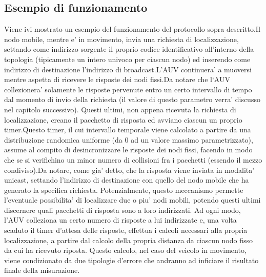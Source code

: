 \subsection{Esempio di funzionamento}
Viene ivi mostrato un esempio del funzionamento del protocollo sopra descritto.\newline Il nodo mobile, mentre e' in movimento, invia una richiesta di localizzazione, settando come indirizzo sorgente il proprio codice identificativo all'interno della topologia (tipicamente un intero univoco per ciascun nodo)
ed inserendo come indirizzo di destinazione l'indirizzo di broadcast.\newline L'AUV continuera' a muoversi mentre aspetta di ricevere le risposte dei nodi fissi.\newline Da notare che l`AUV collezionera' solamente le risposte pervenute entro un certo intervallo di tempo dal momento di invio della richiesta (il valore di questo parametro verra' discusso nel capitolo successivo).\newline
Questi ultimi, non appena ricevuta la richiesta di localizzazione, creano il pacchetto di risposta ed avviano ciascun un proprio timer.\newline Questo timer, il cui intervallo temporale viene calcolato a partire da una distribuzione randomica uniforme (da 0 ad un valore massimo parametrizzato), assume al compito di desincronizzare le risposte dei nodi fissi,
facendo in modo che se si verifichino un minor numero di collisioni fra i pacchetti (essendo il mezzo condiviso).\newline Da notare, come gia' detto, che la risposta viene inviata in modalita' unicast, settando l'indirizzo di destinazione con quello del nodo mobile che ha generato la specifica richiesta.\newline
Potenzialmente, questo meccanismo permette l'eventuale possibilita' di localizzare due o piu' nodi mobili, potendo questi ultimi discernere quali pacchetti di risposta sono a loro indirizzati.\newline
Ad ogni modo, l'AUV colleziona un certo numero di risposte a lui indirizzate e, una volta scaduto il timer d'attesa delle risposte, effettua i calcoli necessari alla propria localizzazione, a partire dal calcolo della propria distanza da ciascun nodo fisso da cui ha ricevuto riposta.\newline
Questo calcolo, nel caso del veicolo in movimento, viene condizionato da due tipologie d'errore che andranno ad inficiare il risultato finale della misurazione.\newline
